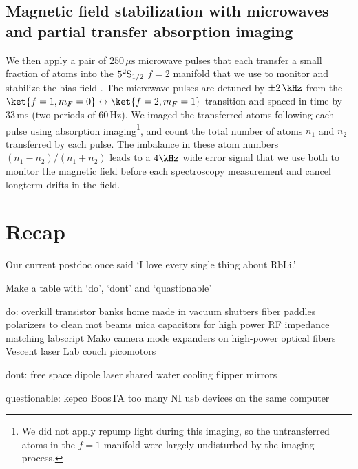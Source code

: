 \subsection{Magnetic field stabilization with microwaves and partial transfer absorption imaging}
\label{sec:ptai}
We then apply a pair of $250\,\mu\mathrm{s}$ microwave  pulses that each transfer a small fraction of atoms into the $5^2{\rm S}_{1/2}$ $f=2$ manifold that we use to monitor and stabilize the bias field \cite{leblanc_direct_2013}. The microwave pulses are detuned by $\pm 2\, \kHz$ from the $\ket{f=1,m_F=0}\leftrightarrow\ket{f=2,m_F=1}$ transition and spaced in time by $33\, \mathrm{ms}$ (two periods of $60\, \mathrm{Hz}$). We imaged the transferred atoms following each pulse using absorption imaging\footnote{We did not apply repump light during this imaging, so the untransferred atoms in the $f=1$ manifold were largely undisturbed by the imaging process.}, and count the total number of atoms $n_1$ and $n_2$ transferred by each pulse. The imbalance in these atom numbers $(n_1-n_2)/(n_1+n_2)$ leads to a $4\kHz$ wide error signal that we use both to monitor the magnetic field before each spectroscopy measurement and cancel longterm drifts in the field. 

\section{Recap}

Our current postdoc once said `I love every single thing about RbLi.' 

Make a table with `do', `dont' and `quastionable'

do:
overkill transistor banks
home made in vacuum shutters
fiber paddles
polarizers to clean mot beams
mica capacitors for high power RF impedance matching
labscript
Mako camera
mode expanders on high-power optical fibers
Vescent laser
Lab couch
picomotors

dont:
free space dipole laser
shared water cooling
flipper mirrors

questionable:
kepco
BoosTA
too many NI usb devices on the same computer